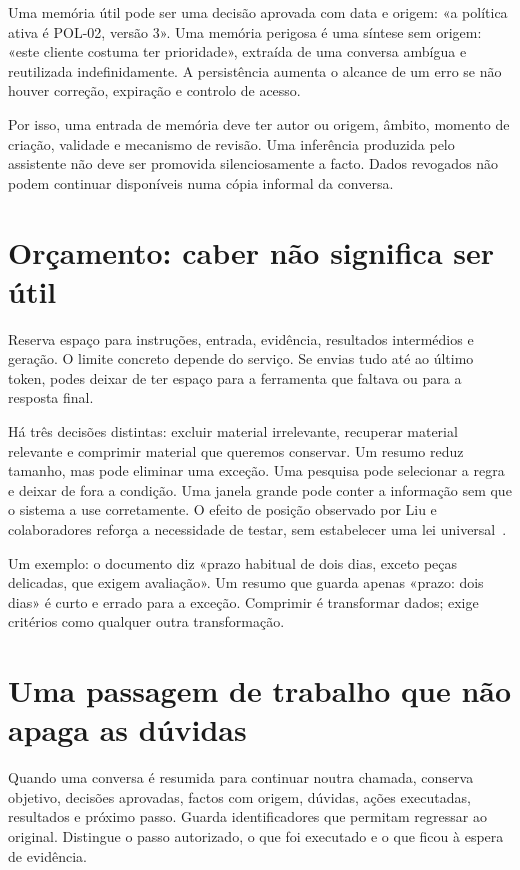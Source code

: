 Uma memória útil pode ser uma decisão aprovada com data e origem: «a política ativa é POL-02, versão 3». Uma memória perigosa é uma síntese sem origem: «este cliente costuma ter prioridade», extraída de uma conversa ambígua e reutilizada indefinidamente. A persistência aumenta o alcance de um erro se não houver correção, expiração e controlo de acesso.

Por isso, uma entrada de memória deve ter autor ou origem, âmbito, momento de criação, validade e mecanismo de revisão. Uma inferência produzida pelo assistente não deve ser promovida silenciosamente a facto. Dados revogados não podem continuar disponíveis numa cópia informal da conversa.

\section{Orçamento: caber não significa ser útil}
Reserva espaço para instruções, entrada, evidência, resultados intermédios e geração. O limite concreto depende do serviço. Se envias tudo até ao último token, podes deixar de ter espaço para a ferramenta que faltava ou para a resposta final.

Há três decisões distintas: excluir material irrelevante, recuperar material relevante e comprimir material que queremos conservar. Um resumo reduz tamanho, mas pode eliminar uma exceção. Uma pesquisa pode selecionar a regra e deixar de fora a condição. Uma janela grande pode conter a informação sem que o sistema a use corretamente. O efeito de posição observado por Liu e colaboradores reforça a necessidade de testar, sem estabelecer uma lei universal~\citep{liu2024}.

Um exemplo: o documento diz «prazo habitual de dois dias, exceto peças delicadas, que exigem avaliação». Um resumo que guarda apenas «prazo: dois dias» é curto e errado para a exceção. Comprimir é transformar dados; exige critérios como qualquer outra transformação.

\section{Uma passagem de trabalho que não apaga as dúvidas}
Quando uma conversa é resumida para continuar noutra chamada, conserva objetivo, decisões aprovadas, factos com origem, dúvidas, ações executadas, resultados e próximo passo. Guarda identificadores que permitam regressar ao original. Distingue o passo autorizado, o que foi executado e o que ficou à espera de evidência.


